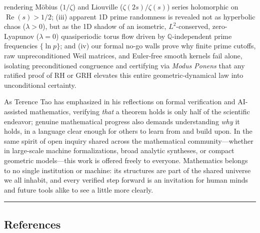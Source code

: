 \documentclass[
  11pt,
]{article}
\begin{document}
\begin{enumerate}
  rendering Möbius (\(1/\zeta\)) and Liouville (\(\zeta(2s)/\zeta(s)\))
  series holomorphic on \(\operatorname{Re}(s) > 1/2\); (iii) apparent
  1D prime randomness is revealed not as hyperbolic chaos
  (\(\lambda > 0\)), but as the 1D shadow of an isometric,
  \(L^2\)-conserved, zero-Lyapunov (\(\lambda = 0\)) quasiperiodic torus
  flow driven by \(\mathbb{Q}\)-independent prime frequencies
  \(\{\ln p\}\); and (iv) our formal no-go walls prove why finite prime
  cutoffs, raw unpreconditioned Weil matrices, and Euler-free smooth
  kernels fail alone, isolating preconditioned congruence and certifying
  via \emph{Modus Ponens} that any ratified proof of RH or GRH elevates
  this entire geometric-dynamical law into unconditional certainty.
\end{enumerate}

As Terence Tao has emphasized in his reflections on formal verification
and AI-assisted mathematics, verifying \emph{that} a theorem holds is
only half of the scientific endeavor; genuine mathematical progress also
demands understanding \emph{why} it holds, in a language clear enough
for others to learn from and build upon. In the same spirit of open
inquiry shared across the mathematical community---whether in
large-scale machine formalizations, broad analytic syntheses, or compact
geometric models---this work is offered freely to everyone. Mathematics
belongs to no single institution or machine: its structures are part of
the shared universe we all inhabit, and every verified step forward is
an invitation for human minds and future tools alike to see a little
more clearly.

\begin{center}\rule{0.5\linewidth}{0.5pt}\end{center}

\subsection{References}\label{references}
\end{document}
